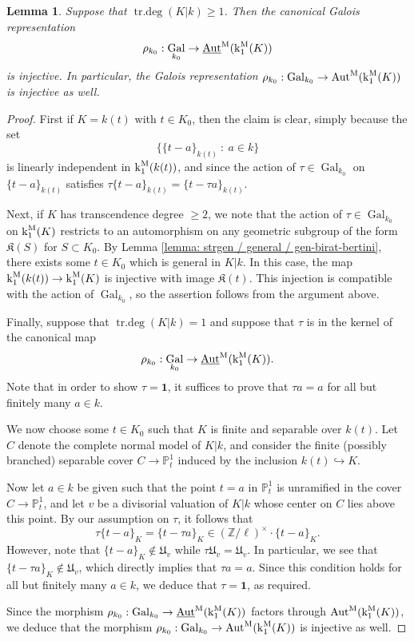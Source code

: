 \documentclass[11pt]{amsart}
\newtheorem{lemma}[proposition]{Lemma}
\theoremstyle{definition}
\theoremstyle{remark}
\numberwithin{equation}{section}
\DeclareMathOperator{\Aut}{Aut}
\DeclareMathOperator{\Gal}{Gal}
\DeclareMathOperator{\trdeg}{tr.deg}
\newcommand{\Z}{\mathbb{Z}}
\newcommand{\Pbb}{\mathbb{P}}
\newcommand{\Kfrak}{\mathfrak{K}}
\newcommand{\Ufrak}{\mathfrak{U}}
\newcommand{\Autm}{\Aut^{\rm M}}
\newcommand{\UAutm}{\underline{\Aut}^{\rm M}}
\renewcommand{\k}{\operatorname{k}^{\rm M}}
\newcommand{\one}{\mathbf{1}}
\newcommand{\Galk}{{\Gal_{k_0}}}
\begin{document}
\begin{lemma}
\label{lemma: strgen / galois-action / faithfulness}
  Suppose that $\trdeg(K|k) \geq 1$.
  Then the canonical Galois representation
  \[ \rho_{k_0} : \Galk \rightarrow \UAutm(\k_1(K)) \]
  is injective.
  In particular, the Galois representation $\rho_{k_0} : \Galk \rightarrow \Autm(\k_1(K))$ is injective as well.
\end{lemma}
\begin{proof}
  First if $K = k(t)$ with $t \in K_0$, then the claim is clear, simply because the set 
  \[\{\{t-a\}_{k(t)} \ : \ a \in k\}\]
  is linearly independent in $\k_1(k(t))$, and since the action of $\tau \in \Galk$ on $\{t-a\}_{k(t)}$ satisfies $\tau \{t-a\}_{k(t)} = \{t-\tau a\}_{k(t)}$.

  Next, if $K$ has transcendence degree $\geq 2$, we note that the action of $\tau \in \Galk$ on $\k_1(K)$ restricts to an automorphism on any geometric subgroup of the form $\Kfrak(S)$ for $S \subset K_0$.
  By Lemma \ref{lemma: strgen / general / gen-birat-bertini}, there exists some $t \in K_0$ which is general in $K|k$.
  In this case, the map $\k_1(k(t)) \rightarrow \k_1(K)$ is injective with image $\Kfrak(t)$.
  This injection is compatible with the action of $\Galk$, so the assertion follows from the argument above.

  Finally, suppose that $\trdeg(K|k) = 1$ and suppose that $\tau$ is in the kernel of the canonical map 
  \[ \rho_{k_0} : \Galk \rightarrow \UAutm(\k_1(K)). \]
  Note that in order to show $\tau = \one$, it suffices to prove that $\tau a = a$ for all but finitely many $a \in k$.

  We now choose some $t \in K_0$ such that $K$ is finite and separable over $k(t)$.
  Let $C$ denote the complete normal model of $K|k$, and consider the finite (possibly branched) separable cover $C \rightarrow \Pbb^1_t$ induced by the inclusion $k(t) \hookrightarrow K$.

  Now let $a \in k$ be given such that the point $t = a$ in $\Pbb^1_t$ is unramified in the cover $C \rightarrow \Pbb^1_t$, and let $v$ be a divisorial valuation of $K|k$ whose center on $C$ lies above this point.
  By our assumption on $\tau$, it follows that 
  \[ \tau\{t-a\}_K = \{t-\tau a\}_K \in (\Z/\ell)^\times \cdot \{t-a\}_K. \]
  However, note that $\{t-a\}_K \notin \Ufrak_v$ while $\tau \Ufrak_v = \Ufrak_v$.
  In particular, we see that $\{t-\tau a\}_K \notin \Ufrak_v$, which directly implies that $\tau a = a$.
  Since this condition holds for all but finitely many $a \in k$, we deduce that $\tau = \one$, as required.

  Since the morphism $\rho_{k_0} : \Galk \rightarrow \UAutm(\k_1(K))$ factors through $\Autm(\k_1(K))$, we deduce that the morphism $\rho_{k_0} : \Galk \rightarrow \Autm(\k_1(K))$ is injective as well.
\end{proof}
\end{document}
